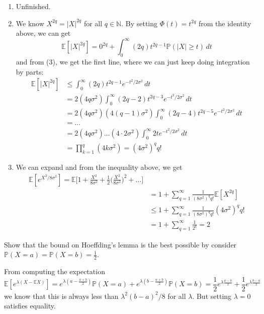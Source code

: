 \documentclass{article}
\begin{document}
\begin{solution}
\begin{enumerate}
      \item Unfinished. 
      
      \item We know $X^{2q} = |X|^{2q}$ for all $q \in \mathbb{N}$. By setting $\Phi(t) = t^{2q}$ from the identity above, we can get 
      \[\mathbb{E}[|X|^{2q}] = 0^{2q} + \int_0^\infty (2q) t^{2q - 1} \mathbb{P}(|X| \geq t) \,dt\]
      and from (3), we get the first line, where we can just keep doing integration by parts: 
      \begin{align*}
          \mathbb{E}[|X|^{2q}] & \leq \int_0^\infty (2q) t^{2q - 1} e^{- t^2 / 2 \sigma^2} \,dt \\
          & = 2 (4q \sigma^2) \int_0^\infty (2q - 2) t^{2q - 3} e^{-t^2 / 2 \sigma^2} \, dt \\
          & = 2 (4q \sigma^2) (4 (q - 1) \sigma^2) \int_0^\infty (2q - 4) t^{2q - 5} e^{-t^2 / 2\sigma^2} \,dt \\
          & = \ldots \\
          & = 2 (4q \sigma^2) \ldots (4 \cdot 2\sigma^2) \int_0^\infty 2t e^{-t^2 / 2 \sigma^2} \,dt \\
          & = \prod_{k=1}^q (4 k \sigma^2) = (4 \sigma^2)^q q! 
      \end{align*}
      
      \item We can expand and from the inequality above, we get 
      \begin{align*}
          \mathbb{E}[e^{X^2 / 8 \sigma^2}] = \mathbb{E} \bigg[ 1 + \frac{X^2}{8 \sigma^2} + \frac{1}{2} \bigg( \frac{X^2}{8 \sigma^2}\bigg)^2 + \ldots \bigg] \\
          & = 1 + \sum_{q = 1}^\infty \frac{1}{(8 \sigma^2)^q q!} \mathbb{E}[X^{2q}] \\
          & \leq 1 + \sum_{q = 1}^\infty \frac{1}{(8 \sigma^2)^q q!} (4 \sigma^2)^q q! \\
          & = 1 + \sum_{q=1}^\infty \frac{1}{2^q} = 2 
      \end{align*}
  \end{enumerate}


  \end{solution}

  \begin{exercise}
  Show that the bound on Hoeffding's lemma is the best possible by consider $\mathbb{P}(X = a) = \mathbb{P}(X = b) = \frac{1}{2}$. 
  \end{exercise}
  \begin{solution}
  From computing the expectation 
  \[\mathbb{E}[ e^{\lambda (X - \mathbb{E} X)}] = e^{\lambda (a - \frac{a + b}{2})} \mathbb{P}(X = a) + e^{\lambda (b - \frac{a + b}{2})} \mathbb{P}(X = b) = \frac{1}{2} e^{ \lambda \frac{a - b}{2}} + \frac{1}{2} e^{\lambda \frac{b - a}{2}}\]
  we know that this is always less than $\lambda^2 (b - a)^2/ 8$ for all $\lambda$. But setting $\lambda = 0$ satisfies equality. 
  \end{solution}
\end{document}

